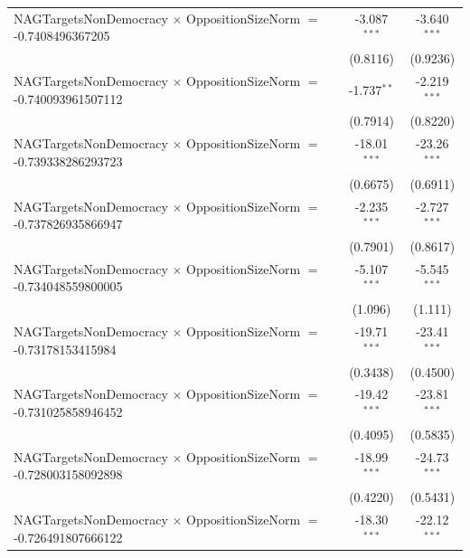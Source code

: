 \begin{tabular}{lcc}
   NAGTargetsNonDemocracy $\times$ OppositionSizeNorm $=$ -0.7408496367205      & -3.087$^{***}$       & -3.640$^{***}$\\   
                                                                                & (0.8116)             & (0.9236)\\   
   NAGTargetsNonDemocracy $\times$ OppositionSizeNorm $=$ -0.740093961507112    & -1.737$^{**}$        & -2.219$^{***}$\\   
                                                                                & (0.7914)             & (0.8220)\\   
   NAGTargetsNonDemocracy $\times$ OppositionSizeNorm $=$ -0.739338286293723    & -18.01$^{***}$       & -23.26$^{***}$\\   
                                                                                & (0.6675)             & (0.6911)\\   
   NAGTargetsNonDemocracy $\times$ OppositionSizeNorm $=$ -0.737826935866947    & -2.235$^{***}$       & -2.727$^{***}$\\   
                                                                                & (0.7901)             & (0.8617)\\   
   NAGTargetsNonDemocracy $\times$ OppositionSizeNorm $=$ -0.734048559800005    & -5.107$^{***}$       & -5.545$^{***}$\\   
                                                                                & (1.096)              & (1.111)\\   
   NAGTargetsNonDemocracy $\times$ OppositionSizeNorm $=$ -0.73178153415984     & -19.71$^{***}$       & -23.41$^{***}$\\   
                                                                                & (0.3438)             & (0.4500)\\   
   NAGTargetsNonDemocracy $\times$ OppositionSizeNorm $=$ -0.731025858946452    & -19.42$^{***}$       & -23.81$^{***}$\\   
                                                                                & (0.4095)             & (0.5835)\\   
   NAGTargetsNonDemocracy $\times$ OppositionSizeNorm $=$ -0.728003158092898    & -18.99$^{***}$       & -24.73$^{***}$\\   
                                                                                & (0.4220)             & (0.5431)\\   
   NAGTargetsNonDemocracy $\times$ OppositionSizeNorm $=$ -0.726491807666122    & -18.30$^{***}$       & -22.12$^{***}$\\   

\end{tabular}
